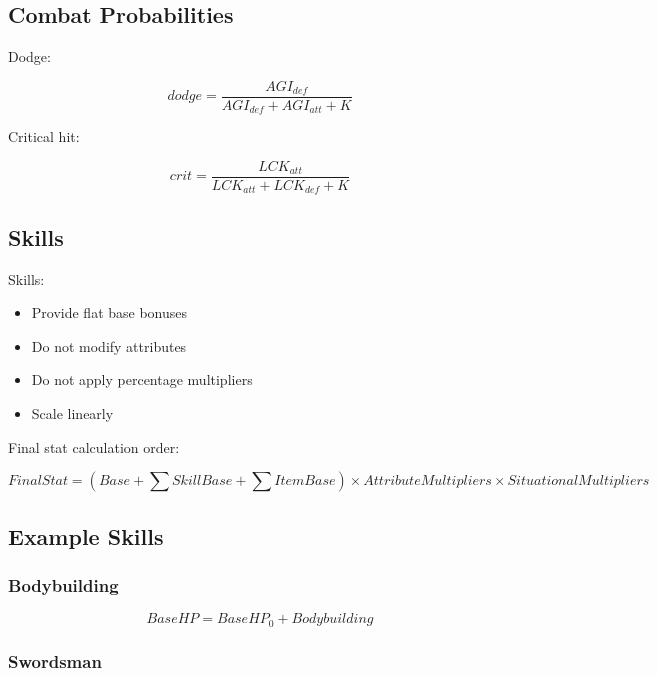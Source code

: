 \documentclass[a4paper,12pt]{article}
\begin{document}
\subsection{Combat Probabilities}

Dodge:

\begin{equation}
dodge = \frac{AGI_{def}}{AGI_{def} + AGI_{att} + K}
\end{equation}

Critical hit:

\begin{equation}
crit = \frac{LCK_{att}}{LCK_{att} + LCK_{def} + K}
\end{equation}



\subsection{Skills}

Skills:

\begin{itemize}
\item Provide flat base bonuses
\item Do not modify attributes
\item Do not apply percentage multipliers
\item Scale linearly
\end{itemize}

Final stat calculation order:

\begin{equation}
FinalStat =
(Base + \sum SkillBase + \sum ItemBase)
\times AttributeMultipliers
\times SituationalMultipliers
\end{equation}

\subsection{Example Skills}

\subsubsection{Bodybuilding}

\begin{equation}
BaseHP = BaseHP_0 + Bodybuilding
\end{equation}

\subsubsection{Swordsman}
\end{document}

